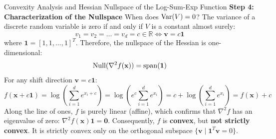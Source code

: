 \begin{examplebox}[breakable]{Convexity Analysis and Hessian Nullspace of the Log-Sum-Exp Function}
\textbf{Step 4: Characterization of the Nullspace}
When does $\operatorname{Var}(V) = 0$?
The variance of a discrete random variable is zero if and only if $V$ is a constant almost surely:
\begin{equation}
v_1 = v_2 = \dots = v_d = c \in \mathbb{R} \iff \mathbf{v} = c \mathbf{1}
\end{equation}
where $\mathbf{1} = [1, 1, \dots, 1]^T$.
Therefore, the nullspace of the Hessian is one-dimensional:
\begin{equation}
\operatorname{Null}(\nabla^2 f(\mathbf{x})) = \operatorname{span}(\mathbf{1})
\end{equation}
For any shift direction $\mathbf{v} = c\mathbf{1}$:
\begin{equation}
f(\mathbf{x} + c\mathbf{1}) = \log\left(\sum_{i=1}^d e^{x_i + c}\right) = \log\left(e^c \sum_{i=1}^d e^{x_i}\right) = c + \log\left(\sum_{i=1}^d e^{x_i}\right) = f(\mathbf{x}) + c
\end{equation}
Along the line of ones, $f$ is purely linear (affine), which confirms that $\nabla^2 f$ has an eigenvalue of zero: $\nabla^2 f(\mathbf{x}) \mathbf{1} = \mathbf{0}$.
Consequently, $f$ is \textbf{convex}, but \textbf{not strictly convex}. It is strictly convex only on the orthogonal subspace $\{\mathbf{v} \mid \mathbf{1}^T \mathbf{v} = 0\}$.
\end{examplebox}

